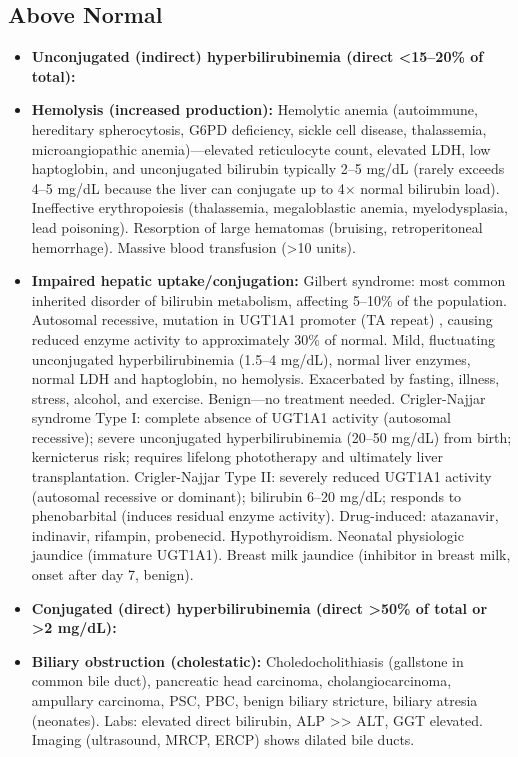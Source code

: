 \subsection*{Above Normal}
\begin{itemize}
  \item \textbf{Unconjugated (indirect) hyperbilirubinemia (direct <15--20\% of total):}
  \item \textbf{Hemolysis (increased production):} Hemolytic anemia (autoimmune, hereditary spherocytosis, G6PD deficiency, sickle cell disease, thalassemia, microangiopathic anemia)---elevated reticulocyte count, elevated LDH, low haptoglobin, and unconjugated bilirubin typically 2--5 mg/dL (rarely exceeds 4--5 mg/dL because the liver can conjugate up to 4$\times$ normal bilirubin load). Ineffective erythropoiesis (thalassemia, megaloblastic anemia, myelodysplasia, lead poisoning). Resorption of large hematomas (bruising, retroperitoneal hemorrhage). Massive blood transfusion (>10 units).
  \item \textbf{Impaired hepatic uptake/conjugation:} Gilbert syndrome: most common inherited disorder of bilirubin metabolism, affecting 5--10\% of the population. Autosomal recessive, mutation in UGT1A1 promoter (TA repeat) \cite{bosma1995genetic}, causing reduced enzyme activity to approximately 30\% of normal. Mild, fluctuating unconjugated hyperbilirubinemia (1.5--4 mg/dL), normal liver enzymes, normal LDH and haptoglobin, no hemolysis. Exacerbated by fasting, illness, stress, alcohol, and exercise. Benign---no treatment needed. Crigler-Najjar syndrome Type I: complete absence of UGT1A1 activity (autosomal recessive); severe unconjugated hyperbilirubinemia (20--50 mg/dL) from birth; kernicterus risk; requires lifelong phototherapy and ultimately liver transplantation. Crigler-Najjar Type II: severely reduced UGT1A1 activity (autosomal recessive or dominant); bilirubin 6--20 mg/dL; responds to phenobarbital (induces residual enzyme activity). Drug-induced: atazanavir, indinavir, rifampin, probenecid. Hypothyroidism. Neonatal physiologic jaundice (immature UGT1A1). Breast milk jaundice (inhibitor in breast milk, onset after day 7, benign).
  \item \textbf{Conjugated (direct) hyperbilirubinemia (direct >50\% of total or >2 mg/dL):}
  \item \textbf{Biliary obstruction (cholestatic):} Choledocholithiasis (gallstone in common bile duct), pancreatic head carcinoma, cholangiocarcinoma, ampullary carcinoma, PSC, PBC, benign biliary stricture, biliary atresia (neonates). Labs: elevated direct bilirubin, ALP >> ALT, GGT elevated. Imaging (ultrasound, MRCP, ERCP) shows dilated bile ducts.

\end{itemize}
